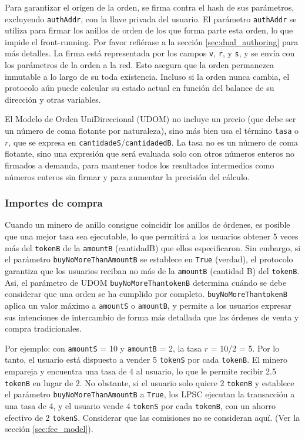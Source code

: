 \documentclass[UTF8,nofonts]{article}
\begin{document}
\begin{multicols}{2}
Para garantizar el origen de la orden, se firma contra el hash de sus par\'ametros, excluyendo \verb|authAddr|, con la llave privada del usuario. El par\'ametro \verb|authAddr| se utiliza para firmar los anillos de orden de los que forma parte esta orden, lo que impide el front-running. Por favor refi\'erase a la secci\'on \ref{sec:dual_authoring} para m\'as detalles. La firma est\'a representada por los campos \verb|v|, \verb|r|, y \verb|s|, y se env\'ia con los par\'ametros de la orden a la red. Esto asegura que la orden permanezca inmutable a lo largo de su toda existencia. Incluso si la orden nunca cambia, el protocolo a\'un puede calcular su estado actual en funci\'on del balance de su direcci\'on y otras variables. 

El Modelo de Orden UniDireccional (UDOM) no incluye un precio (que debe ser un n\'umero de coma flotante por naturaleza), sino m\'as bien usa el t\'ermino \verb|tasa| o $r$, que se expresa en \verb|cantidadeS|/\verb|cantidadedB|. La tasa no es un n\'umero de coma flotante, sino una expresi\'on que ser\'a evaluada solo con otros n\'umeros enteros no firmados a demanda, para mantener todos los resultados intermedios como n\'umeros enteros sin firmar y para aumentar la precisi\'on del c\'alculo.

\subsubsection{Importes de compra}

Cuando un minero de anillo consigue coincidir los anillos de \'ordenes, es posible que una mejor tasa sea ejecutable, lo que permitir\'a a los usuarios obtener 5 veces m\'as del \verb|tokenB| de la \verb|amountB| (cantidadB) que ellos especificaron. Sin embargo, si el par\'ametro \verb|buyNoMoreThanAmountB| se establece en \verb|True| (verdad), el protocolo garantiza que los usuarios reciban no m\'as de la \verb|amountB| (cantidad B) del \verb|tokenB|. Asi, el par\'ametro de UDOM \verb|buyNoMoreThantokenB| determina cu\'ando se debe considerar que una orden se ha cumplido por completo. \verb|buyNoMoreThantokenB| aplica un valor m\'aximo a \verb|amountS| o \verb|amountB|, y permite a los usuarios expresar sus intenciones de intercambio de forma m\'as detallada que las \'ordenes de venta y compra tradicionales.

Por ejemplo: con \verb|amountS| = 10 y \verb|amountB| = 2, la tasa $r$ = 10/2 = 5. Por lo tanto, el usuario est\'a dispuesto a vender 5  \verb|tokenS| por cada \verb|tokenB|. El minero empareja y encuentra una tasa de 4 al usuario, lo que le permite recibir 2.5 \verb|tokenB| en lugar de 2. No obstante, si el usuario solo quiere 2 \verb|tokenB| y establece el par\'ametro \verb|buyNoMoreThanAmountB| a \verb|True|, los LPSC ejecutan la transacci\'on a una tasa de 4, y el usuario vende 4 \verb|tokenS| por cada \verb|tokenB|, con un ahorro efectivo de 2 \verb|tokenS|. Considerar que las comisiones no se consideran aqu\'i.  (Ver la secci\'on \ref{sec:fee_model}).


\end{multicols}
\end{document}
